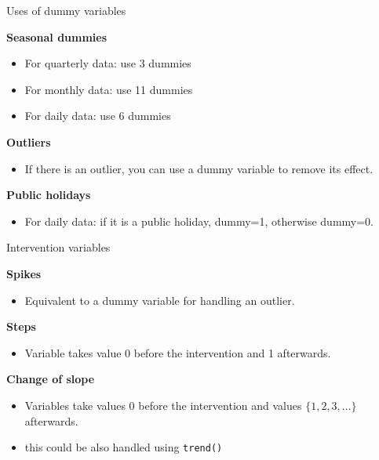 \documentclass[
  14pt,
  ignorenonframetext,
  aspectratio=169,
]{beamer}
\providecommand{\tightlist}{%
  \setlength{\itemsep}{0pt}\setlength{\parskip}{0pt}}
\begin{document}
\begin{frame}{Uses of dummy variables}
\protect{}\label{uses-of-dummy-variables}
\fontsize{13}{15}\sf

\textbf{Seasonal dummies}

\begin{itemize}
\tightlist
\item
  For quarterly data: use 3 dummies
\item
  For monthly data: use 11 dummies
\item
  For daily data: use 6 dummies
\end{itemize}

\pause

\textbf{Outliers}

\begin{itemize}
\tightlist
\item
  If there is an outlier, you can use a dummy variable to remove its
  effect.
\end{itemize}

\pause

\textbf{Public holidays}

\begin{itemize}
\tightlist
\item
  For daily data: if it is a public holiday, dummy=1, otherwise dummy=0.
\end{itemize}
\end{frame}

\begin{frame}[fragile]{Intervention variables}
\protect{}\label{intervention-variables}
\fontsize{12}{13}\sf

\textbf{Spikes}

\begin{itemize}
\tightlist
\item
  Equivalent to a dummy variable for handling an outlier. \pause
\end{itemize}

\textbf{Steps}

\begin{itemize}
\tightlist
\item
  Variable takes value 0 before the intervention and 1 afterwards.
  \pause
\end{itemize}

\textbf{Change of slope}

\begin{itemize}
\item
  Variables take values 0 before the intervention and values
  \(\{1,2,3,\dots\}\) afterwards.
\item
  this could be also handled using \texttt{trend()}
\end{itemize}
\end{frame}
\end{document}
